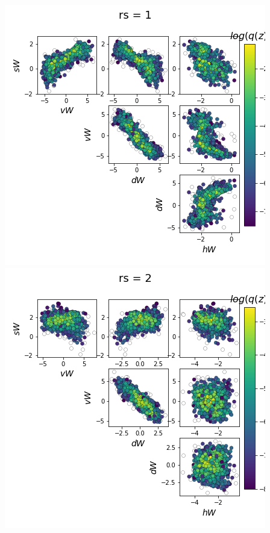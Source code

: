 \documentclass[11pt]{article}
\begin{document}
\begin{center}
\includegraphics[scale=0.33]{figs/Z_SC_pvar_reduced_c=0_p=50_rs=1.png}
\includegraphics[scale=0.33]{figs/Z_SC_pvar_reduced_c=0_p=50_rs=2.png}

\end{center}
\end{document}
